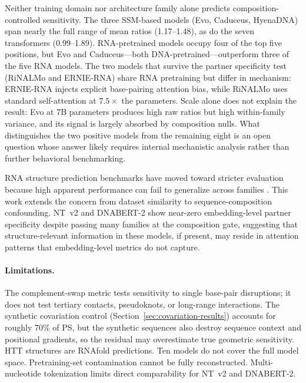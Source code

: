 \documentclass[11pt]{article}
\begin{document}
Neither training domain nor architecture family alone predicts
composition-controlled sensitivity. The three SSM-based models (Evo,
Caduceus, HyenaDNA) span nearly the full range of mean ratios
(1.17--1.48), as do the seven transformers (0.99--1.89). RNA-pretrained
models occupy four of the top five positions, but Evo and Caduceus---both
DNA-pretrained---outperform three of the five RNA models. The two models
that survive the partner specificity test (RiNALMo and ERNIE-RNA) share
RNA pretraining but differ in mechanism: ERNIE-RNA injects explicit
base-pairing attention bias, while RiNALMo uses standard self-attention at
$7.5\times$ the parameters. Scale alone does not explain the result:
Evo at 7B parameters produces high raw ratios but high within-family
variance, and its signal is largely absorbed by composition nulls. What
distinguishes the two positive models from the remaining eight is an open
question whose answer likely requires internal mechanistic analysis rather
than further behavioral benchmarking.

RNA structure prediction benchmarks have moved toward stricter evaluation
because high apparent performance can fail to generalize across families
\citep{szikszai2022generalization}. This work extends the concern from
dataset similarity to sequence-composition confounding. NT~v2 and DNABERT-2
show near-zero embedding-level partner specificity despite passing many
families at the composition gate, suggesting that structure-relevant
information in these models, if present, may reside in attention patterns
that embedding-level metrics do not capture.

\paragraph{Limitations.}
The complement-swap metric tests sensitivity to single base-pair disruptions;
it does not test tertiary contacts, pseudoknots, or long-range interactions.
The synthetic covariation control (Section~\ref{sec:covariation-results})
accounts for roughly 70\% of PS, but the synthetic sequences also destroy
sequence context and positional gradients, so the residual may overestimate
true geometric sensitivity. HTT structures
are RNAfold predictions. Ten models do not cover the full model space. Pretraining-set contamination cannot be
fully reconstructed. Multi-nucleotide tokenization limits direct
comparability for NT~v2 and DNABERT-2.
\end{document}
